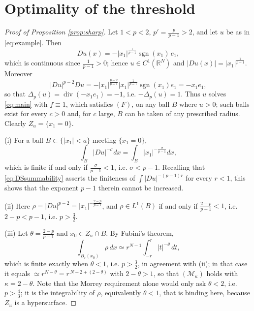\documentclass[reqno]{amsart}
\theoremstyle{plain}
\theoremstyle{definition}
\theoremstyle{remark}
\newcommand{\R}{\mathbb{R}}
\newcommand{\Lap}[1]{\Delta_{#1}}
\begin{document}
\section{Optimality of the threshold}\label{sec:remarks}

\begin{proof}[Proof of Proposition \ref{prop:sharp}]
Let $1<p<2$, $p'=\frac{p}{p-1}>2$, and let $u$ be as in \eqref{eq:example}. Then
\[
Du(x)=-|x_1|^{\frac{1}{p-1}}\operatorname{sgn}(x_1)\,e_1 ,
\]
which is continuous since $\frac1{p-1}>0$; hence $u\in C^1(\R^N)$ and
$|Du(x)|=|x_1|^{\frac1{p-1}}$. Moreover
\[
|Du|^{p-2}Du=-|x_1|^{\frac{p-2}{p-1}}|x_1|^{\frac{1}{p-1}}\operatorname{sgn}(x_1)e_1=-x_1e_1 ,
\]
so that $\Lap{p}(u)=\operatorname{div}(-x_1e_1)=-1$, i.e. $-\Lap{p}(u)=1$. Thus $u$ solves
\eqref{eq:main} with $f\equiv1$, which satisfies $(F)$, on any ball $B$ where $u>0$; such balls exist
for every $c>0$ and, for $c$ large, $B$ can be taken of any prescribed radius. Clearly
$Z_u=\{x_1=0\}$.

(i) For a ball $B\subset\{|x_1|<a\}$ meeting $\{x_1=0\}$,
\[
\int_B|Du|^{-\sigma}dx=\int_B|x_1|^{-\frac{\sigma}{p-1}}dx ,
\]
which is finite if and only if $\frac{\sigma}{p-1}<1$, i.e. $\sigma<p-1$. Recalling that
\eqref{eq:DSsummability} asserts the finiteness of $\int|Du|^{-(p-1)r}$ for every $r<1$, this shows
that the exponent $p-1$ therein cannot be increased.

(ii) Here $\rho=|Du|^{p-2}=|x_1|^{-\frac{2-p}{p-1}}$, and $\rho\in L^1(B)$ if and only if
$\frac{2-p}{p-1}<1$, i.e. $2-p<p-1$, i.e. $p>\frac32$.

(iii) Let $\theta=\frac{2-p}{p-1}$ and $x_0\in Z_u\cap B$. By Fubini's theorem,
\[
\int_{B_r(x_0)}\rho\,dx\simeq r^{N-1}\int_{-r}^{r}|t|^{-\theta}\,dt ,
\]
which is finite exactly when $\theta<1$, i.e. $p>\frac32$, in agreement with (ii); in that case it
equals $\simeq r^{N-\theta}=r^{\,N-2+(2-\theta)}$ with $2-\theta>1$, so that $(\mathcal M_\kappa)$
holds with $\kappa=2-\theta$. Note that the Morrey requirement alone would only ask $\theta<2$,
i.e. $p>\frac43$; it is the integrability of $\rho$, equivalently $\theta<1$, that is binding
here, because $Z_u$ is a hypersurface.
\end{proof}
\end{document}

